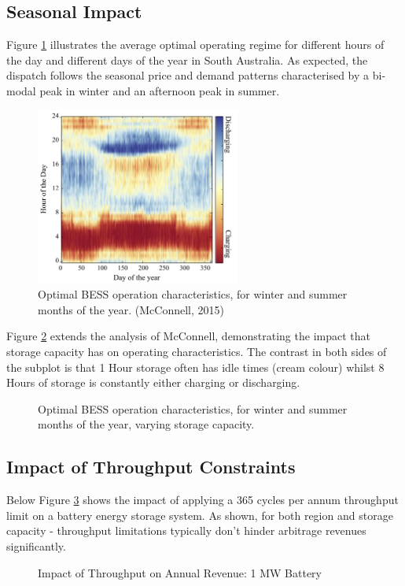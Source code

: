 \subsection{ Seasonal Impact }
Figure \ref{fig:mcconnell_heatmap} illustrates the average optimal operating regime for different hours of the day and different days of the year in South Australia. As expected, the dispatch follows the seasonal price and demand patterns characterised by a bi-modal peak in winter and an afternoon peak in summer.
\begin{figure}[H]
    \centering
    \includegraphics[width=0.6\textwidth]{Pictures/Chapter3/mcconnel_heatmap.png}
    \caption{Optimal BESS operation characteristics, for winter and summer months of the year. (McConnell, 2015)}
    \label{fig:mcconnell_heatmap}
\end{figure}
Figure \ref{fig:heatmap} extends the analysis of McConnell, demonstrating the impact that storage capacity has on operating characteristics. The contrast in both sides of the subplot is that 1 Hour storage often has idle times (cream colour) whilst 8 Hours of storage is constantly either charging or discharging.
\begin{figure}[H]
    \centering
    \caption{Optimal BESS operation characteristics, for winter and summer months of the year, varying storage capacity.}
    \label{fig:heatmap}
\end{figure}
\subsection{ Impact of Throughput Constraints }
Below Figure \ref{fig:throughput_limit} shows the impact of applying a 365 cycles per annum throughput limit on a battery energy storage system. As shown, for both region and storage capacity - throughput limitations typically don't hinder arbitrage revenues significantly. 
\begin{figure}[H]
    \centering
    \caption{Impact of Throughput on Annual Revenue: 1 MW Battery}
    \label{fig:throughput_limit}
\end{figure}
